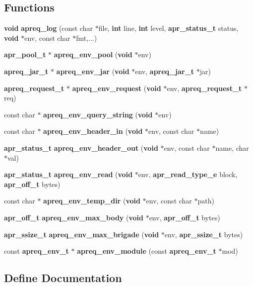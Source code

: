 \subsection*{Functions}
\begin{CompactItemize}
\item 
{\bf void} {\bf apreq\_\-log} (const char $\ast$file, {\bf int} line, {\bf int} level, {\bf apr\_\-status\_\-t} status, {\bf void} $\ast$env, const char $\ast$fmt,...)
\item 
{\bf apr\_\-pool\_\-t} $\ast$ {\bf apreq\_\-env\_\-pool} ({\bf void} $\ast$env)
\item 
{\bf apreq\_\-jar\_\-t} $\ast$ {\bf apreq\_\-env\_\-jar} ({\bf void} $\ast$env, {\bf apreq\_\-jar\_\-t} $\ast$jar)
\item 
{\bf apreq\_\-request\_\-t} $\ast$ {\bf apreq\_\-env\_\-request} ({\bf void} $\ast$env, {\bf apreq\_\-request\_\-t} $\ast$req)
\item 
const char $\ast$ {\bf apreq\_\-env\_\-query\_\-string} ({\bf void} $\ast$env)
\item 
const char $\ast$ {\bf apreq\_\-env\_\-header\_\-in} ({\bf void} $\ast$env, const char $\ast$name)
\item 
{\bf apr\_\-status\_\-t} {\bf apreq\_\-env\_\-header\_\-out} ({\bf void} $\ast$env, const char $\ast$name, char $\ast$val)
\item 
{\bf apr\_\-status\_\-t} {\bf apreq\_\-env\_\-read} ({\bf void} $\ast$env, {\bf apr\_\-read\_\-type\_\-e} block, {\bf apr\_\-off\_\-t} bytes)
\item 
const char $\ast$ {\bf apreq\_\-env\_\-temp\_\-dir} ({\bf void} $\ast$env, const char $\ast$path)
\item 
{\bf apr\_\-off\_\-t} {\bf apreq\_\-env\_\-max\_\-body} ({\bf void} $\ast$env, {\bf apr\_\-off\_\-t} bytes)
\item 
{\bf apr\_\-ssize\_\-t} {\bf apreq\_\-env\_\-max\_\-brigade} ({\bf void} $\ast$env, {\bf apr\_\-ssize\_\-t} bytes)
\item 
const {\bf apreq\_\-env\_\-t} $\ast$ {\bf apreq\_\-env\_\-module} (const {\bf apreq\_\-env\_\-t} $\ast$mod)
\end{CompactItemize}


\subsection{Define Documentation}
